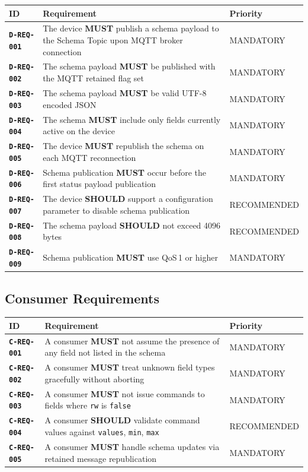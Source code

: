 \documentclass[11pt,a4paper]{article}
\newcommand{\must}{\textbf{MUST}}
\newcommand{\should}{\textbf{SHOULD}}
\newcommand{\reqid}[1]{\textbf{\texttt{#1}}}
\begin{document}
\begin{tabularx}{\textwidth}{@{}lXl@{}}
\toprule
\textbf{ID} & \textbf{Requirement} & \textbf{Priority} \\
\midrule
\rowcolor{lightbg}
\reqid{D-REQ-001} & The device \must{} publish a schema payload to the Schema Topic upon MQTT broker connection & MANDATORY \\
\reqid{D-REQ-002} & The schema payload \must{} be published with the MQTT retained flag set & MANDATORY \\
\rowcolor{lightbg}
\reqid{D-REQ-003} & The schema payload \must{} be valid UTF-8 encoded JSON & MANDATORY \\
\reqid{D-REQ-004} & The schema \must{} include only fields currently active on the device & MANDATORY \\
\rowcolor{lightbg}
\reqid{D-REQ-005} & The device \must{} republish the schema on each MQTT reconnection & MANDATORY \\
\reqid{D-REQ-006} & Schema publication \must{} occur before the first status payload publication & MANDATORY \\
\rowcolor{lightbg}
\reqid{D-REQ-007} & The device \should{} support a configuration parameter to disable schema publication & RECOMMENDED \\
\reqid{D-REQ-008} & The schema payload \should{} not exceed 4096 bytes & RECOMMENDED \\
\rowcolor{lightbg}
\reqid{D-REQ-009} & Schema publication \must{} use QoS\,1 or higher & MANDATORY \\
\bottomrule
\end{tabularx}

\subsection{Consumer Requirements}

\begin{tabularx}{\textwidth}{@{}lXl@{}}
\toprule
\textbf{ID} & \textbf{Requirement} & \textbf{Priority} \\
\midrule
\rowcolor{lightbg}
\reqid{C-REQ-001} & A consumer \must{} not assume the presence of any field not listed in the schema & MANDATORY \\
\reqid{C-REQ-002} & A consumer \must{} treat unknown field types gracefully without aborting & MANDATORY \\
\rowcolor{lightbg}
\reqid{C-REQ-003} & A consumer \must{} not issue commands to fields where \texttt{rw} is \texttt{false} & MANDATORY \\
\reqid{C-REQ-004} & A consumer \should{} validate command values against \texttt{values}, \texttt{min}, \texttt{max} & RECOMMENDED \\
\rowcolor{lightbg}
\reqid{C-REQ-005} & A consumer \must{} handle schema updates via retained message republication & MANDATORY \\
\bottomrule
\end{tabularx}
\end{document}
